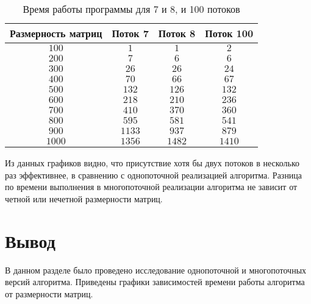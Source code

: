 \documentclass[12pt, a4paper]{report}
\begin{document}
	\begin{table}[ht!]
		\caption{Время работы программы для 7 и 8, и 100 потоков}
		\label{table3}
		\begin{center}
			\begin{tabular}{|c|c|c|c|}
				\hline
				\bf{Размерность матриц} & \bf{Поток 7} & \bf{Поток 8} & \bf{Поток 100}\\\hline
				
				$100$ & $1$ & $1$ & $2$\\\hline
				
				$200$ & $7$ & $6$ & $6$\\\hline
				
				$300$ & $26$ & $26$ & $24$\\\hline
				
				$400$ & $70$ & $66$ & $67$\\\hline
				
				$500$ & $132$ & $126$ & $132$\\\hline
				
				$600$ & $218$ & $210$ & $236$\\\hline
				
				$700$ & $410$ & $370$ & $360$\\\hline
				
				$800$ & $595$ & $581$ & $541$\\\hline
				
				$900$ & $1133$ & $937$ & $879$\\\hline
				
				$1000$ & $1356$ & $1482$ & $1410$\\\hline
			\end{tabular}
		\end{center}
	\end{table}

	Из данных графиков видно, что присутствие хотя бы двух потоков в несколько раз эффективнее, в сравнению с однопоточной реализацией алгоритма. Разница по времени выполнения в многопоточной реализации алгоритма не зависит от четной или нечетной размерности матриц. 
	\newpage
	
	\section{Вывод}
	
	\hspace{0.6cm}В данном разделе было проведено исследование однопоточной и многопоточных версий алгоритма. Приведены графики зависимостей времени работы алгоритма от размерности матриц.
	
\end{document}

